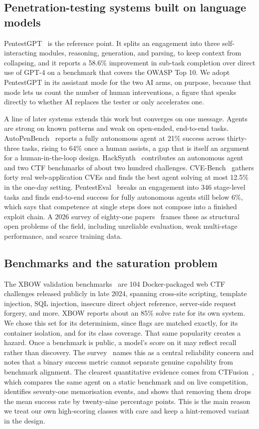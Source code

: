 \documentclass[11pt]{article}
\begin{document}
\subsection{Penetration-testing systems built on language models}
PentestGPT~\cite{deng2024} is the reference point. It splits an engagement into three self-interacting modules, reasoning, generation, and parsing, to keep context from collapsing, and it reports a 58.6\% improvement in sub-task completion over direct use of GPT-4 on a benchmark that covers the OWASP Top 10. We adopt PentestGPT in its assistant mode for the two AI arms, on purpose, because that mode lets us count the number of human interventions, a figure that speaks directly to whether AI replaces the tester or only accelerates one.

A line of later systems extends this work but converges on one message. Agents are strong on known patterns and weak on open-ended, end-to-end tasks. AutoPenBench~\cite{gioacchini2025} reports a fully autonomous agent at 21\% success across thirty-three tasks, rising to 64\% once a human assists, a gap that is itself an argument for a human-in-the-loop design. HackSynth~\cite{muzsai2024} contributes an autonomous agent and two CTF benchmarks of about two hundred challenges. CVE-Bench~\cite{zhu2025} gathers forty real web-application CVEs and finds the best agent solving at most 12.5\% in the one-day setting. PentestEval~\cite{yang2025} breaks an engagement into 346 stage-level tasks and finds end-to-end success for fully autonomous agents still below 6\%, which says that competence at single steps does not compose into a finished exploit chain. A 2026 survey of eighty-one papers~\cite{he2026} frames these as structural open problems of the field, including unreliable evaluation, weak multi-stage performance, and scarce training data.

\subsection{Benchmarks and the saturation problem}
The XBOW validation benchmarks~\cite{xbow2024} are 104 Docker-packaged web CTF challenges released publicly in late 2024, spanning cross-site scripting, template injection, SQL injection, insecure direct object reference, server-side request forgery, and more. XBOW reports about an 85\% solve rate for its own system. We chose this set for its determinism, since flags are matched exactly, for its container isolation, and for its class coverage. That same popularity creates a hazard. Once a benchmark is public, a model's score on it may reflect recall rather than discovery. The survey~\cite{he2026} names this as a central reliability concern and notes that a binary success metric cannot separate genuine capability from benchmark alignment. The clearest quantitative evidence comes from CTFusion~\cite{lee2026}, which compares the same agent on a static benchmark and on live competition, identifies seventy-one memorisation events, and shows that removing them drops the mean success rate by twenty-nine percentage points. This is the main reason we treat our own high-scoring classes with care and keep a hint-removed variant in the design.
\end{document}
